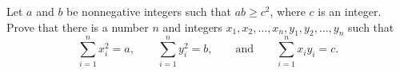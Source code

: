 Let $a$ and $b$ be nonnegative integers such that $ab \geq c^2$, where $c$ is an integer. Prove that there is a number $n$ and integers $x_1, x_2, \ldots, x_n, y_1, y_2, \ldots, y_n$ such that
\[ \sum_{i=1}^{n} x_i^2 = a, \qquad \sum_{i=1}^{n} y_i^2 = b, \qquad \text{and} \qquad \sum_{i=1}^{n} x_i y_i = c. \]

